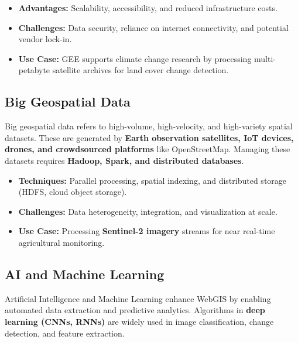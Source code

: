 \documentclass[
  11pt,
  letterpaper,
]{book}
\providecommand{\tightlist}{%
  \setlength{\itemsep}{0pt}\setlength{\parskip}{0pt}}
\begin{document}
\begin{itemize}
\tightlist
\item
  \textbf{Advantages:} Scalability, accessibility, and reduced
  infrastructure costs.\\
\item
  \textbf{Challenges:} Data security, reliance on internet connectivity,
  and potential vendor lock-in.\\
\item
  \textbf{Use Case:} GEE supports climate change research by processing
  multi-petabyte satellite archives for land cover change detection.
\end{itemize}

\subsection{Big Geospatial Data}\label{big-geospatial-data}

Big geospatial data refers to high-volume, high-velocity, and
high-variety spatial datasets. These are generated by \textbf{Earth
observation satellites, IoT devices, drones, and crowdsourced platforms}
like OpenStreetMap. Managing these datasets requires \textbf{Hadoop,
Spark, and distributed databases}.

\begin{itemize}
\tightlist
\item
  \textbf{Techniques:} Parallel processing, spatial indexing, and
  distributed storage (HDFS, cloud object storage).\\
\item
  \textbf{Challenges:} Data heterogeneity, integration, and
  visualization at scale.\\
\item
  \textbf{Use Case:} Processing \textbf{Sentinel-2 imagery} streams for
  near real-time agricultural monitoring.
\end{itemize}

\subsection{AI and Machine Learning}\label{ai-and-machine-learning}

Artificial Intelligence and Machine Learning enhance WebGIS by enabling
automated data extraction and predictive analytics. Algorithms in
\textbf{deep learning (CNNs, RNNs)} are widely used in image
classification, change detection, and feature extraction.
\end{document}
